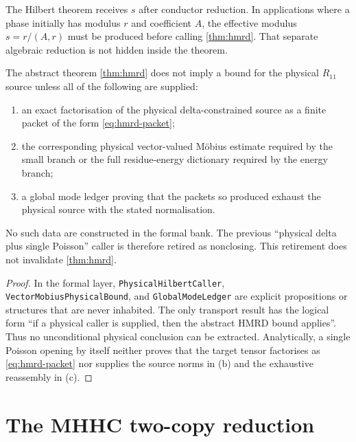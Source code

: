 \begin{remark}
The Hilbert theorem receives $s$ after conductor reduction.  In applications
where a phase initially has modulus $r$ and coefficient $A$, the effective
modulus $s=r/(A,r)$ must be produced before calling \cref{thm:hmrd}.  That
separate algebraic reduction is not hidden inside the theorem.
\end{remark}

\begin{proposition}\label{prop:physical-caller}
The abstract theorem \cref{thm:hmrd} does not imply a bound for the physical
$R_{11}$ source unless all of the following are supplied:
\begin{enumerate}[label=\textup{(\alph*)},leftmargin=2.7em]
\item an exact factorisation of the physical delta-constrained source as a
      finite packet of the form \cref{eq:hmrd-packet};
\item the corresponding physical vector-valued M\"obius estimate required by
      the small branch or the full residue-energy dictionary required by the
      energy branch;
\item a global mode ledger proving that the packets so produced exhaust the
      physical source with the stated normalisation.
\end{enumerate}
No such data are constructed in the formal bank.  The previous
``physical delta plus single Poisson'' caller is therefore retired as
nonclosing.  This retirement does not invalidate \cref{thm:hmrd}.
\end{proposition}

\begin{proof}
In the formal layer, \texttt{PhysicalHilbertCaller},
\texttt{VectorMobiusPhysicalBound}, and \texttt{GlobalModeLedger} are explicit
propositions or structures that are never inhabited.  The only transport
result has the logical form ``if a physical caller is supplied, then the
abstract HMRD bound applies''.  Thus no unconditional physical conclusion can
be extracted.  Analytically, a single Poisson opening by itself neither proves
that the target tensor factorises as \cref{eq:hmrd-packet} nor supplies the
source norms in (b) and the exhaustive reassembly in (c).
\end{proof}

\section{The MHHC two-copy reduction}\label{sec:mhhc}

